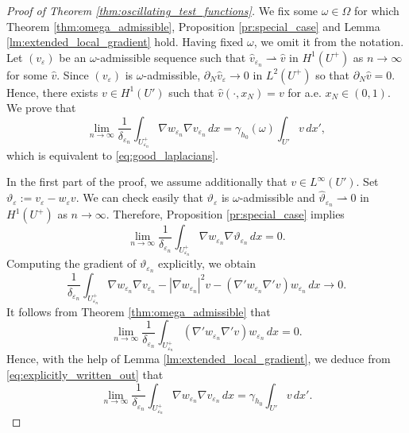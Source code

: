 \documentclass{article}
\numberwithin{equation}{section}
\theoremstyle{definition}
\theoremstyle{remark}
\begin{document}
\begin{proof}[Proof of Theorem \ref{thm:oscillating_test_functions}]
     We fix some $\omega \in \Omega$ for which Theorem \ref{thm:omega_admissible}, Proposition \ref{pr:special_case} and Lemma \ref{lm:extended_local_gradient} hold. Having fixed $\omega$, we omit it from the notation. Let $(v_\varepsilon)$ be an $\omega$-admissible sequence such that $\hat{v}_{\varepsilon_n} \rightharpoonup \hat{v}$ in $H^1(U^+)$ as $n \to \infty$ for some $\hat{v}$. Since $(v_\varepsilon)$ is $\omega$-admissible, $\partial_N \hat{v}_\varepsilon \to 0$ in $L^2(U^+)$ so that $\partial_N \hat{v} = 0$. Hence, there exists $v \in H^1(U')$ such that $\hat{v}(\cdot, x_N) = v$ for a.e. $x_N \in (0, 1)$. We prove that
     \[
     \lim_{n \to \infty} \frac{1}{\delta_{\varepsilon_n}} \int_{U_{\varepsilon_n}^+} \nabla w_{\varepsilon_n} \nabla v_{\varepsilon_n} \, dx = \gamma_{h_0}(\omega) \int_{U'} v \, dx',
     \]
    which is equivalent to \eqref{eq:good_laplacians}.
     
    In the first part of the proof, we assume additionally that $v \in L^\infty(U')$. Set $\vartheta_\varepsilon := v_\varepsilon - w_\varepsilon v$. We can check easily that $\vartheta_\varepsilon$ is $\omega$-admissible and $\hat{\vartheta}_{\varepsilon_n} \rightharpoonup 0$ in $H^1(U^+)$ as $n \to \infty$. Therefore, Proposition \ref{pr:special_case} implies
    \[
    \lim_{n \to \infty} \frac{1}{\delta_{\varepsilon_n}} \int_{U_{\varepsilon_n}^+} \nabla w_{\varepsilon_n} \nabla \vartheta_{\varepsilon_n} \, dx = 0.
    \]
    Computing the gradient of $\vartheta_{\varepsilon_n}$ explicitly, we obtain
    \begin{equation} \label{eq:explicitly_written_out}
        \frac{1}{\delta_{\varepsilon_n}} \int_{U_{\varepsilon_n}^+} \nabla w_{\varepsilon_n} \nabla v_{\varepsilon_n} - |\nabla w_{\varepsilon_n}|^2 v  -  (\nabla' w_{\varepsilon_n} \nabla' v) w_{\varepsilon_n} \, dx \to 0.
    \end{equation}
    It follows from Theorem \ref{thm:omega_admissible} that
    \[
    \lim_{n \to \infty} \frac{1}{\delta_{\varepsilon_n}} \int_{U_{\varepsilon_n}^+} (\nabla' w_{\varepsilon_n} \nabla' v) w_{\varepsilon_n} \, dx = 0.
    \]
    Hence, with the help of Lemma \ref{lm:extended_local_gradient}, we deduce from \eqref{eq:explicitly_written_out} that
    \[
    \lim_{n \to \infty} \frac{1}{\delta_{\varepsilon_n}} \int_{U_{\varepsilon_n}^+} \nabla w_{\varepsilon_n} \nabla v_{\varepsilon_n} \, dx = \gamma_{h_0} \int_{U'} v \, dx'.
    \]


\end{proof}
\end{document}
